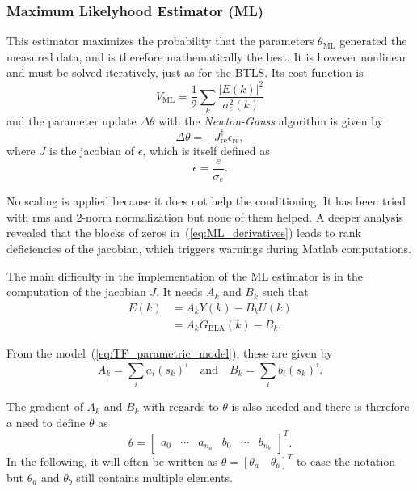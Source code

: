 \subsubsection{Maximum Likelyhood Estimator (ML)}
\label{sec:ML}

This estimator maximizes the probability that the parameters $\theta_{\text{ML}}$ generated the measured data, and is therefore mathematically the best. It is however nonlinear and must be solved iteratively, just as for the BTLS. Its cost function is
\begin{equation}
    V_{\text{ML}} = \frac{1}{2} \sum_k \frac{|E(k)|^2}{\sigma_e^2(k)}
    \label{eq:ML_cost}
\end{equation}
and the parameter update $\Delta \theta$ with the \textit{Newton-Gauss} algorithm is given by
\begin{equation}
    \Delta \theta = -J_{\text{re}}^\dagger \epsilon_{\text{re}},
    \label{eq:ML_update}
\end{equation}
where $J$ is the jacobian of $\epsilon$, which is itself defined as
\begin{equation}
    \epsilon = \frac{e}{\sigma_e}.
\end{equation}

No scaling is applied because it does not help the conditioning. It has been tried with rms and 2-norm normalization but none of them helped. A deeper analysis revealed that the blocks of zeros in~(\ref{eq:ML_derivatives}) leads to rank deficiencies of the jacobian, which triggers warnings during Matlab computations.

The main difficulty in the implementation of the ML estimator is in the computation of the jacobian $J$. It needs $A_k$ and $B_k$ such that
\begin{equation}
    \begin{aligned}
        E(k) &= A_k Y(k) - B_k U(k)\\
        &= A_k G_{\text{BLA}}(k) - B_k.
    \end{aligned}
\end{equation}

From the model~(\ref{eq:TF_parametric_model}), these are given by
\begin{equation}
    A_k = \sum_i a_i (s_k)^i \quad \text{and} \quad B_k = \sum_i b_i (s_k)^i.
\end{equation}

The gradient of $A_k$ and $B_k$ with regards to $\theta$ is also needed and there is therefore a need to define $\theta$ as
\begin{equation}
    \theta = \begin{bmatrix}
        a_0 & \cdots & a_{n_a}& b_0 & \cdots & b_{n_b}
    \end{bmatrix}^T.
\end{equation}
In the following, it will often be written as $\theta = [\theta_a \quad \theta_b]^T$ to ease the notation but $\theta_a$ and $\theta_b$ still contains multiple elements.

